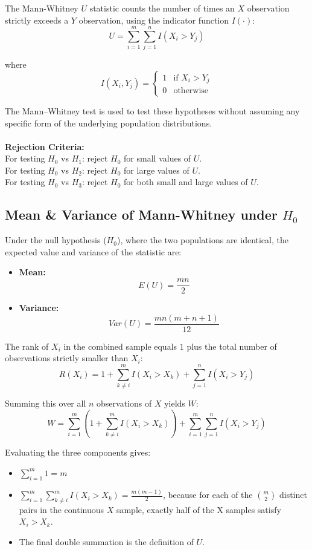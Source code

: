 \documentclass[10pt]{article}
\begin{document}
The Mann-Whitney $U$ statistic counts the number of times an $X$ observation strictly exceeds a $Y$ observation, using the indicator function $I(\cdot)$:
$$U = \sum_{i=1}^m \sum_{j=1}^n I(X_i > Y_j)$$

where
\[
I(X_i, Y_j) = 
\begin{cases} 
      1 & \text{if } X_i > Y_j \\
      0 & \text{otherwise} 
\end{cases}
\]

The Mann--Whitney test is used to test these hypotheses without assuming any specific form of the underlying population distributions.\\ \\
\textbf{Rejection Criteria:}\\ For testing $H_0$ vs $H_1$: reject $H_0$ for small values of $U$.\\ For testing $H_0$ vs $H_2$: reject $H_0$ for large values of $U$.\\ For testing $H_0$ vs $H_3$: reject $H_0$ for both small and large values of $U$.

\subsection{Mean \& Variance of Mann-Whitney under $H_0$}
Under the null hypothesis ($H_0$), where the two populations are identical, the expected value and variance of the statistic are:
\begin{itemize}
    \item \textbf{Mean:} 
    \begin{equation}
        E(U) = \frac{mn}{2}
    \end{equation}
    \item \textbf{Variance:} 
    \begin{equation}
        Var(U) = \frac{mn(m+n+1)}{12}
    \end{equation}
\end{itemize}

The rank of $X_i$ in the combined sample equals $1$ plus the total number of observations strictly smaller than $X_i$:
$$R(X_i) = 1 + \sum_{k \neq i}^m I(X_i > X_k) + \sum_{j=1}^n I(X_i > Y_j)$$

Summing this over all $n$ observations of $X$ yields $W$:
$$W = \sum_{i=1}^m \left( 1 + \sum_{k \neq i}^m I(X_i > X_k) \right) + \sum_{i=1}^m \sum_{j=1}^n I(X_i > Y_j)$$

Evaluating the three components gives:
\begin{itemize}
    \item $\sum_{i=1}^m 1 = m$
    \item $\sum_{i=1}^m \sum_{k \neq i}^m I(X_i > X_k) = \frac{m(m-1)}{2}$, because for each of the $\binom{m}{2}$ distinct pairs in the continuous $X$ sample, exactly half of the X samples satisfy $X_i > X_k$.
    \item The final double summation is the definition of $U$.
\end{itemize}
\end{document}
